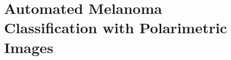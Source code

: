 \clearemptydoublepage
\acresetall
\chapter{Automated Melanoma Classification with Polarimetric Images} 
\label{chp:chapter5}






